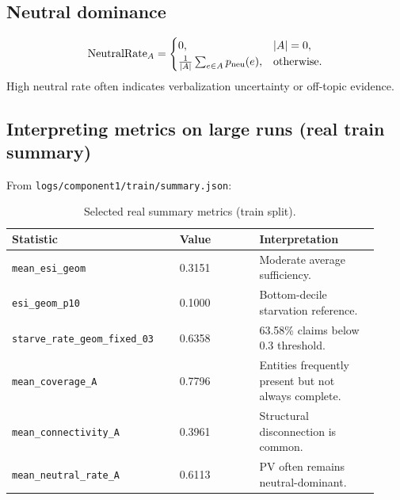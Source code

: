 \subsection{Neutral dominance}
\begin{equation}
\text{NeutralRate}_{A} =
\begin{cases}
0, & |A|=0,\\
\frac{1}{|A|}\sum_{e\in A} p_{\mathrm{neu}}(e), & \text{otherwise.}
\end{cases}
\end{equation}
High neutral rate often indicates verbalization uncertainty or off-topic evidence.

\subsection{Interpreting metrics on large runs (real train summary)}
From \texttt{logs/component1/train/summary.json}:
\begin{table}[H]
\centering
\begin{tabular}{@{}p{0.42\linewidth}p{0.20\linewidth}p{0.30\linewidth}@{}}
\toprule
Statistic & Value & Interpretation \\
\midrule
\texttt{mean\_esi\_geom} & 0.3151 & Moderate average sufficiency. \\
\texttt{esi\_geom\_p10} & 0.1000 & Bottom-decile starvation reference. \\
\texttt{starve\_rate\_geom\_fixed\_03} & 0.6358 & 63.58\% claims below 0.3 threshold. \\
\texttt{mean\_coverage\_A} & 0.7796 & Entities frequently present but not always complete. \\
\texttt{mean\_connectivity\_A} & 0.3961 & Structural disconnection is common. \\
\texttt{mean\_neutral\_rate\_A} & 0.6113 & PV often remains neutral-dominant. \\
\bottomrule
\end{tabular}
\caption{Selected real summary metrics (train split).}
\label{tab:c1_real_summary_stats}
\end{table}
